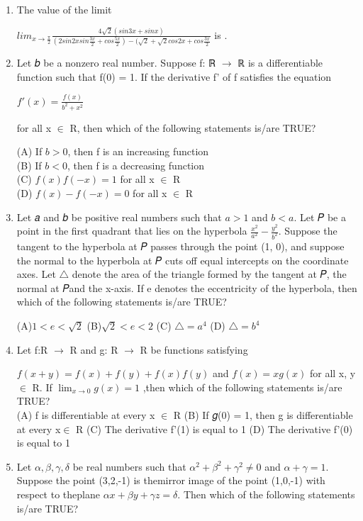\documentclass{article}
\begin{document}
\begin{enumerate}
\item The value of the limit
         
	 $lim_{x \to \frac{\pi}{2}}\frac{4\sqrt{2}(sin3x + sinx)}{(2 sin2xsin\frac{3x}{2} + cos\frac{5x}{2}) - (\sqrt{2}+\sqrt{2}cos2x + cos\frac{3x}{2}}$ is \underline{\hspace{1cm}}.

\item Let 𝑏 be a nonzero real number. Suppose f: ℝ $\to$ ℝ is a differentiable function such that f(0) = 1.
If the derivative f' of f satisfies the equation
               
	       $f'(x) = \frac{f(x)}{b^2 + x^2}$
	       
for all x $\in$ R, then which of the following statements is/are TRUE?

(A) If $b > 0$, then f is an increasing function\\
(B) If $b < 0$, then f is a decreasing function \\
(C) $f(x)f(-x) = 1$ for all x $\in$ R\\
(D) $f(x) - f(-x) = 0$ for all x $\in$ R

\item Let 𝑎 and 𝑏 be positive real numbers such that $a > 1$ and $b < a$. Let 𝑃 be a point in the first quadrant that lies on the hyperbola $\frac{x^2}{a^2} - \frac{y^2}{b^2}$. Suppose the tangent to the hyperbola at 𝑃 passes through the point (1, 0), and suppose the normal to the hyperbola at 𝑃 cuts off equal intercepts on the coordinate axes. Let $\triangle$ denote the area of the triangle formed by the tangent at 𝑃, the normal at 𝑃and the x-axis. If e denotes the eccentricity of the hyperbola, then which of the following statements is/are TRUE?

(A)$1< e <\sqrt{2}$  
(B)$\sqrt{2}< e <2$  
(C) $\triangle = a^4$ 
(D) $\triangle = b^4$

\item Let f:R $\to$ R and g: R $\to$ R be functions satisfying

$f(x + y) = f(x) + f(y) + f(x)f(y)$ and $f(x) = xg(x)$
for all x, y $\in$ R. If $\lim_{x \to 0}g(x) = 1$
,then which of the following statements is/are TRUE?\\

(A) f is differentiable at every x $\in$ R
(B) If 𝑔(0) = 1, then g is differentiable at every x$\in$ R
(C) The derivative f'(1) is equal to 1
(D) The derivative f'(0) is equal to 1

\item Let $\alpha,\beta,\gamma,\delta$ be real numbers such that $\alpha^2 + \beta^2 + \gamma^2 \neq 0$ and $\alpha + \gamma = 1$. Suppose the point (3,2,-1) is themirror image of the point (1,0,-1) with respect to theplane ${\alpha}x + {\beta}y + {\gamma}z = \delta$. 
Then which of the following statements is/are TRUE?\\


\end{enumerate}
\end{document}
